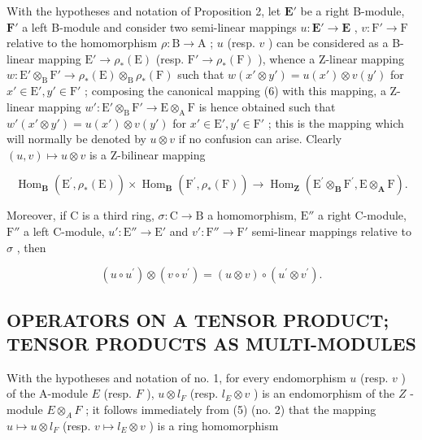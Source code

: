 With the hypotheses and notation of Proposition 2, let \(\mathbf{E}'\) be a right B-module, \(\mathbf{F}'\) a left B-module and consider two semi-linear mappings \(u: \mathbf{E}' \to \mathbf{E}\) , \(v: \mathrm{F}' \to \mathrm{F}\) relative to the homomorphism \(\rho: \mathrm{B} \to \mathrm{A}\) ; \(u\) (resp. \(v\) ) can be considered as a B-linear mapping \(\mathrm{E}' \to \rho_*(\mathrm{E})\) (resp. \(\mathrm{F}' \to \rho_*(\mathrm{F})\) ), whence a Z-linear mapping \(w: \mathrm{E}' \otimes_{\mathrm{B}} \mathrm{F}' \to \rho_*(\mathrm{E}) \otimes_{\mathrm{B}} \rho_*(\mathrm{F})\) such that \(w(x' \otimes y') = u(x') \otimes v(y')\) for \(x' \in \mathrm{E}', y' \in \mathrm{F}'\) ; composing the canonical mapping (6) with this mapping, a Z-linear mapping \(w': \mathrm{E}' \otimes_{\mathrm{B}} \mathrm{F}' \to \mathrm{E} \otimes_{\mathrm{A}} \mathrm{F}\) is hence obtained such that \(w'(x' \otimes y') = u(x') \otimes v(y')\) for \(x' \in \mathrm{E}', y' \in \mathrm{F}'\) ; this is the mapping which will normally be denoted by \(u \otimes v\) if no confusion can arise. Clearly \((u, v) \mapsto u \otimes v\) is a Z-bilinear mapping

\[
\operatorname{Hom} _ {\mathbf {B}} \left(\mathrm{E} ^ {\prime}, \rho_ {*} (\mathrm{E})\right) \times \operatorname{Hom} _ {\mathbf {B}} \left(\mathrm{F} ^ {\prime}, \rho_ {*} (\mathrm{F})\right)\rightarrow \operatorname{Hom} _ {\mathbf {Z}} \left(\mathrm{E} ^ {\prime} \otimes_ {\mathbf {B}} \mathrm{F} ^ {\prime}, \mathrm{E} \otimes_ {\mathbf {A}} \mathrm{F}\right).
\]

Moreover, if C is a third ring, \(\sigma: \mathrm{C} \to \mathrm{B}\) a homomorphism, \(\mathrm{E}''\) a right C-module, \(\mathrm{F}''\) a left C-module, \(u': \mathrm{E}'' \to \mathrm{E}'\) and \(v': \mathrm{F}'' \to \mathrm{F}'\) semi-linear mappings relative to \(\sigma\) , then

\[
(u \circ u ^ {\prime}) \otimes (v \circ v ^ {\prime}) = (u \otimes v) \circ (u ^ {\prime} \otimes v ^ {\prime}).
\]

\subsection{OPERATORS ON A TENSOR PRODUCT; TENSOR PRODUCTS AS MULTI-MODULES}

With the hypotheses and notation of no. 1, for every endomorphism \(u\) (resp. \(v\) ) of the A-module \(E\) (resp. \(F\) ), \(u \otimes l_F\) (resp. \(l_E \otimes v\) ) is an endomorphism of the \(Z\) -module \(E \otimes_A F\) ; it follows immediately from (5) (no. 2) that the mapping \(u \mapsto u \otimes l_F\) (resp. \(v \mapsto l_E \otimes v\) ) is a ring homomorphism

